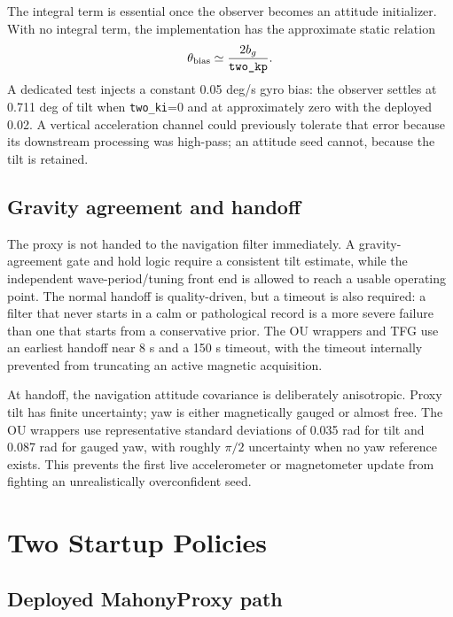 \documentclass[conference]{IEEEtran}
\begin{document}
The integral term is essential once the observer becomes an attitude initializer.
With no integral term, the implementation has the approximate static relation
\begin{equation}
\theta_{\rm bias}\simeq \frac{2b_g}{\texttt{two\_kp}}.
\label{eq:static-tilt}
\end{equation}
A dedicated test injects a constant 0.05 deg/s gyro bias: the observer settles at
0.711 deg of tilt when \texttt{two\_ki}=0 and at approximately zero with the deployed
0.02.  A vertical acceleration channel could previously tolerate that error because
its downstream processing was high-pass; an attitude seed cannot, because the tilt
is retained.

\subsection{Gravity agreement and handoff}

The proxy is not handed to the navigation filter immediately.  A gravity-agreement
gate and hold logic require a consistent tilt estimate, while the independent
wave-period/tuning front end is allowed to reach a usable operating point.  The
normal handoff is quality-driven, but a timeout is also required: a filter that never
starts in a calm or pathological record is a more severe failure than one that starts
from a conservative prior.  The OU wrappers and TFG use an earliest handoff near
8 s and a 150 s timeout, with the timeout internally prevented from truncating an
active magnetic acquisition.

At handoff, the navigation attitude covariance is deliberately anisotropic.  Proxy
tilt has finite uncertainty; yaw is either magnetically gauged or almost free.  The
OU wrappers use representative standard deviations of 0.035 rad for tilt and
0.087 rad for gauged yaw, with roughly $\pi/2$ uncertainty when no yaw reference
exists.  This prevents the first live accelerometer or magnetometer update from
fighting an unrealistically overconfident seed.

\section{Two Startup Policies}
\label{sec:policies}

\subsection{Deployed MahonyProxy path}
\end{document}

